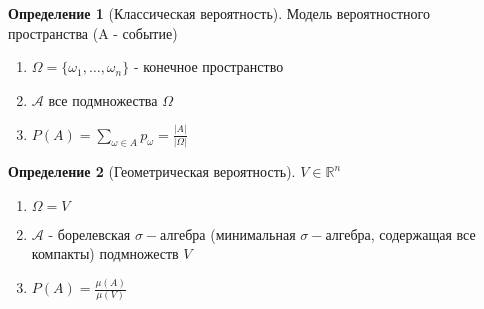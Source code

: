 \documentclass[a4paper]{article}
\theoremstyle{definition}
\newtheorem*{definition}{Определение}
\theoremstyle{remark}
\begin{document}
\begin{multicols*}{2}
    \begin{definition}[Классическая вероятность]
        Модель вероятностного пространства (A - событие)
        \begin{enumerate}
            \item $\Omega = \{\omega_1, \dots, \omega_n\}$ - конечное пространство
            \item $\mathcal{A}$ все подмножества $\Omega$
            \item $P(A) = \sum\limits_{\omega\in A}p_\omega = \frac{|A|}{|\Omega|}$
        \end{enumerate}
    \end{definition}
    \vfill\null\columnbreak
    \begin{definition}[Геометрическая вероятность]  
        $V\in \mathbb{R}^n$
        \begin{enumerate}
            \item $\Omega = V$
            \item $\mathcal{A}$ - борелевская $\sigma-$алгебра 
            (минимальная $\sigma-$алгебра, содержащая все компакты) подмножеств $V$
            \item $P(A) = \frac{\mu(A)}{\mu(V)}$
        \end{enumerate}
    \end{definition}
\end{multicols*}
\end{document}
